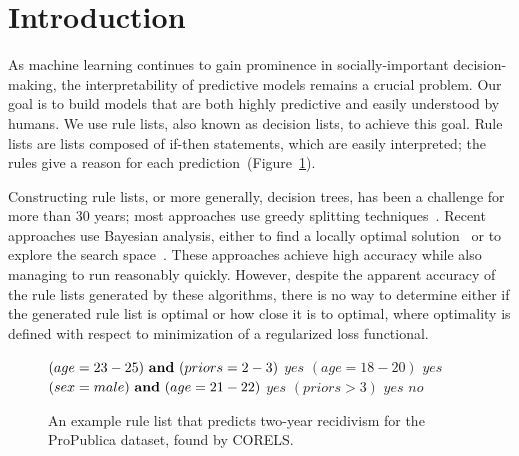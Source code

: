 \section{Introduction}

As machine learning continues to gain prominence in socially-important decision-making,
the interpretability of predictive models remains a crucial problem.
%
Our goal is to build models that are both highly predictive and easily understood by humans.
%
We use rule lists, also known as decision lists, to achieve this goal.
%
Rule lists are lists composed of if-then statements, which are easily interpreted; the rules give a reason for each prediction~(Figure~\ref{fig:rule-list}).

Constructing rule lists, or more generally, decision trees, has been a challenge for more than
30 years; most approaches use greedy splitting techniques~\citep{Rivest87,Breiman84,Quinlan93}. 
%
Recent approaches use Bayesian analysis, either to find a locally optimal solution~\citep{Chipman:1998jh} or to explore the search space~\citep{LethamRuMcMa15, YangRuSe16}.
%
These approaches achieve high accuracy while also managing to run reasonably quickly.
%
However, despite the apparent accuracy of the rule lists generated by these algorithms,
there is no way to determine either if the generated rule list is optimal or how close it is to optimal,
where optimality is defined with respect to minimization of a regularized loss functional.

\begin{arxiv}
\begin{figure}[t!]
\begin{algorithmic}
\State \bif $(age=23-25) {\bf ~and~} (priors=2-3)$ \bthen $yes$
\State \belif $(age=18-20)$ \bthen $yes$
\State \belif $(sex=male) {\bf ~and~} (age=21-22)$ \bthen $yes$
\State \belif $(priors>3)$ \bthen $yes$
\State \belse $no$
\end{algorithmic}
\caption{An example rule list that predicts two-year recidivism
for the ProPublica dataset, found by CORELS.
}
\label{fig:rule-list}
\end{figure}
\end{arxiv}

